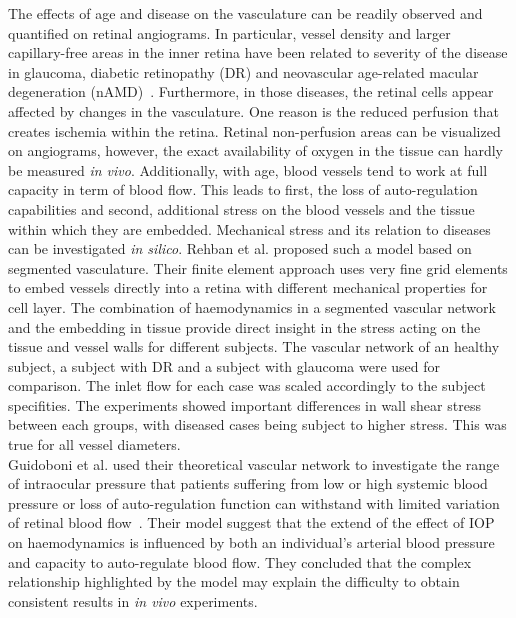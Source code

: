 \documentclass[12pt,a4paper]{article}
\begin{document}
The effects of age and disease on the vasculature can be readily observed and quantified on retinal angiograms.
In particular, vessel density and larger capillary-free areas in the inner retina have been related to severity of the disease in glaucoma, diabetic retinopathy (DR) and neovascular age-related macular degeneration (nAMD)~\cite{Al_Sheikh_2016, Rao_2020, Yuan_2020}.
Furthermore, in those diseases, the retinal cells appear affected by changes in the vasculature.
One reason is the reduced perfusion that creates ischemia within the retina.
Retinal non-perfusion areas can be visualized on angiograms, however, the exact availability of oxygen in the tissue can hardly be measured \textit{in vivo}.
Additionally, with age, blood vessels tend to work at full capacity in term of blood flow.
This leads to first, the loss of auto-regulation capabilities and second, additional stress on the blood vessels and the tissue within which they are embedded.
Mechanical stress and its relation to diseases can be investigated \textit{in silico}.
Rehban et al. proposed such a model based on segmented vasculature.
Their finite element approach uses very fine grid elements to embed vessels directly into a retina with different mechanical properties for cell layer.
The combination of haemodynamics in a segmented vascular network and the embedding in tissue provide direct insight in the stress acting on the tissue and vessel walls for different subjects.
The vascular network of an healthy subject, a subject with DR and a subject with glaucoma were used for comparison.
The inlet flow for each case was scaled accordingly to the subject specifities.
The experiments showed important differences in wall shear stress between each groups, with diseased cases being subject to higher stress.
This was true for all vessel diameters.\\
Guidoboni et al. used their theoretical vascular network to investigate the range of intraocular pressure that patients suffering from low or high systemic blood pressure or loss of auto-regulation function can withstand with limited variation of retinal blood flow~\cite{Guidoboni_2014b}.
Their model suggest that the extend of the effect of IOP on haemodynamics is influenced by both an individual's arterial blood pressure and capacity to auto-regulate blood flow.
They concluded that the complex relationship highlighted by the model may explain the difficulty to obtain consistent results in \textit{in vivo} experiments.
\end{document}
